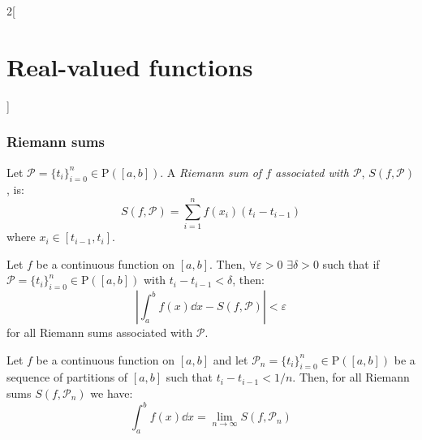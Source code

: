 \documentclass[../../../main.tex]{subfiles}
\begin{document}
\begin{multicols}{2}[\section{Real-valued functions}]
  \subsubsection{Riemann sums}
  \begin{definition}
    Let $\mathcal{P}=\{t_i\}_{i=0}^n\in\mathrm{P}([a,b])$. A \textit{Riemann sum of $f$ associated with $\mathcal{P}$}, $S(f,\mathcal{P})$, is: $$S(f,\mathcal{P})=\sum_{i=1}^nf(x_i)(t_i-t_{i-1})$$ where $x_i\in[t_{i-1},t_i]$.
  \end{definition}
  \begin{theorem}
    Let $f$ be a continuous function on $[a,b]$. Then, $\forall\varepsilon>0$ $\exists\delta>0$ such that if $\mathcal{P}=\{t_i\}_{i=0}^n\in\mathrm{P}([a,b])$ with $t_i-t_{i-1}<\delta$, then: $$\left|\int_a^bf(x)\dd x-S(f,\mathcal{P})\right|<\varepsilon$$ for all Riemann sums associated with $\mathcal{P}$.
  \end{theorem}
  \begin{corollary}
    Let $f$ be a continuous function on $[a,b]$ and let $\mathcal{P}_n=\{t_i\}_{i=0}^n\in\mathrm{P}([a,b])$ be a sequence of partitions of $[a,b]$ such that $t_i-t_{i-1}<1/n$. Then, for all Riemann sums $S(f,\mathcal{P}_n)$ we have: $$\int_a^bf(x)\dd x=\lim_{n\to\infty}S(f,\mathcal{P}_n)$$
  \end{corollary}

\end{multicols}
\end{document}
